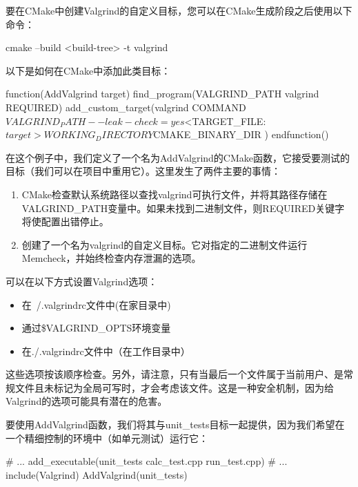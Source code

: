 要在CMake中创建Valgrind的自定义目标，您可以在CMake生成阶段之后使用以下命令：

\begin{shell}
cmake --build <build-tree> -t valgrind
\end{shell}

以下是如何在CMake中添加此类目标：


\begin{cmake}
function(AddValgrind target)
    find_program(VALGRIND_PATH valgrind REQUIRED)
    add_custom_target(valgrind
        COMMAND ${VALGRIND_PATH} --leak-check=yes
        $<TARGET_FILE:${target}>
        WORKING_DIRECTORY ${CMAKE_BINARY_DIR}
    )
endfunction()
\end{cmake}

在这个例子中，我们定义了一个名为AddValgrind的CMake函数，它接受要测试的目标（我们可以在项目中重用它）。这里发生了两件主要的事情：

\begin{enumerate}
\item
CMake检查默认系统路径以查找valgrind可执行文件，并将其路径存储在VALGRIND\_PATH变量中。如果未找到二进制文件，则REQUIRED关键字将使配置出错停止。

\item
创建了一个名为valgrind的自定义目标。它对指定的二进制文件运行Memcheck，并始终检查内存泄漏的选项。
\end{enumerate}

可以在以下方式设置Valgrind选项：

\begin{itemize}
\item
在~/.valgrindrc文件中(在家目录中)

\item
通过\$VALGRIND\_OPTS环境变量

\item
在./.valgrindrc文件中（在工作目录中）
\end{itemize}

这些选项按该顺序检查。另外，请注意，只有当最后一个文件属于当前用户、是常规文件且未标记为全局可写时，才会考虑该文件。这是一种安全机制，因为给Valgrind的选项可能具有潜在的危害。

要使用AddValgrind函数，我们将其与unit\_tests目标一起提供，因为我们希望在一个精细控制的环境中（如单元测试）运行它：


\begin{cmake}
# ...
add_executable(unit_tests calc_test.cpp run_test.cpp)
# ...
include(Valgrind)
AddValgrind(unit_tests)
\end{cmake}


